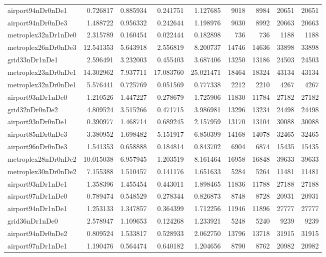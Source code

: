 \begin{longtable}{|l|r|r|r|r|r|r|r|r|}
airport94nDr0nDe1 & 0.726817 & 0.885934 & 0.241751 & 1.127685 & 9018 & 8984 & 20651 & 20651 \\
airport94nDr0nDe3 & 1.488722 & 0.956332 & 0.242644 & 1.198976 & 9030 & 8992 & 20663 & 20663 \\
metroplex32nDr1nDe0 & 2.315789 & 0.160454 & 0.022444 & 0.182898 & 736 & 736 & 1188 & 1188 \\
metroplex26nDr0nDe3 & 12.541353 & 5.643918 & 2.556819 & 8.200737 & 14746 & 14636 & 33898 & 33898 \\
grid33nDr1nDe1 & 2.596491 & 3.232003 & 0.455403 & 3.687406 & 13250 & 13186 & 24503 & 24503 \\
metroplex23nDr0nDe1 & 14.302962 & 7.937711 & 17.083760 & 25.021471 & 18464 & 18324 & 43134 & 43134 \\
metroplex32nDr0nDe1 & 5.576441 & 0.725769 & 0.051569 & 0.777338 & 2212 & 2210 & 4267 & 4267 \\
airport93nDr1nDe0 & 1.210526 & 1.447227 & 0.278679 & 1.725906 & 11830 & 11784 & 27182 & 27182 \\
grid32nDr0nDe2 & 4.809524 & 3.515266 & 0.471715 & 3.986981 & 13296 & 13234 & 24498 & 24498 \\
airport93nDr0nDe1 & 0.390977 & 1.468714 & 0.689245 & 2.157959 & 13170 & 13104 & 30088 & 30088 \\
airport85nDr0nDe3 & 3.380952 & 1.698482 & 5.151917 & 6.850399 & 14168 & 14078 & 32465 & 32465 \\
airport96nDr0nDe3 & 1.541353 & 0.658888 & 0.184814 & 0.843702 & 6904 & 6874 & 15435 & 15435 \\
metroplex28nDr0nDe2 & 10.015038 & 6.957945 & 1.203519 & 8.161464 & 16958 & 16848 & 39633 & 39633 \\
metroplex30nDr0nDe2 & 7.155388 & 1.510457 & 0.141176 & 1.651633 & 5284 & 5264 & 11481 & 11481 \\
airport93nDr1nDe1 & 1.358396 & 1.455454 & 0.443011 & 1.898465 & 11836 & 11788 & 27188 & 27188 \\
airport97nDr1nDe0 & 0.789474 & 0.548529 & 0.278344 & 0.826873 & 8748 & 8728 & 20931 & 20931 \\
airport94nDr1nDe1 & 1.253133 & 1.347857 & 0.364399 & 1.712256 & 11946 & 11896 & 27777 & 27777 \\
grid36nDr1nDe0 & 2.578947 & 1.109653 & 0.124268 & 1.233921 & 5248 & 5240 & 9239 & 9239 \\
airport94nDr0nDe2 & 0.809524 & 1.533817 & 0.528933 & 2.062750 & 13796 & 13718 & 31915 & 31915 \\
airport97nDr1nDe1 & 1.190476 & 0.564474 & 0.640182 & 1.204656 & 8790 & 8762 & 20982 & 20982 \\

\end{longtable}
